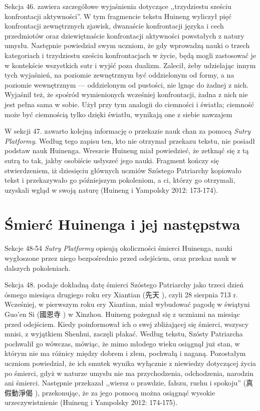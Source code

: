 Sekcja 46. zawiera szczegółowe wyjaśnienia dotyczące ,,trzydziestu sześciu konfrontacji aktywności''. W tym fragmencie tekstu Huineng wyliczył pięć konfrontacji zewnętrznych zjawisk, dwanaście konfrontacji języka i cech przedmiotów oraz dziewiętnaście konfrontacji aktywności powstałych z natury umysłu.
Następnie powiedział swym uczniom, że gdy wprowadzą nauki o trzech kategoriach i trzydziestu sześciu konfrontacjach w życie, będą mogli zastosować je w kontekście wszystkich sutr i wyjść poza dualizm.
Zalecił, żeby udzielając innym tych wyjaśnień, na poziomie zewnętrznym być oddzielonym od formy, a na poziomie wewnętrznym --- oddzielonym od pustości, nie lgnąc do żadnej z nich.
Wyjaśnił też, że spośród wymienionych wcześniej konfrontacji, żadna z nich nie jest pełna sama w sobie.
Użył przy tym analogii do ciemności i światła; ciemność może być ciemnością tylko dzięki światłu, wynikają one z siebie nawzajem\ibid

W sekcji 47. zawarto kolejną informację o przekazie nauk chan za pomocą \textit{Sutry Platformy}. %
Według tego zapisu ten, kto nie otrzymał przekazu tekstu, nie posiadł podstaw nauk Huinenga.
Wreszcie Huineng miał powiedzieć, że zetknąć się z tą sutrą to tak, jakby osobiście usłyszeć jego nauki.
Fragment kończy się stwierdzeniem, iż dziesięciu głównych uczniów Szóstego Patriarchy kopiowało tekst i przekazywało go późniejszym pokoleniom, a ci, którzy go otrzymali, uzyskali wgląd w swoją naturę
(Huineng i Yampolsky 2012: 173-174).

\section{Śmierć Huinenga i jej następstwa}
Sekcje 48-54 \textit{Sutry Platformy} opisują okoliczności śmierci Huinenga, nauki wygłoszone przez niego bezpośrednio przed odejściem, oraz przekaz nauk w dalszych pokoleniach.

Sekcja 48. podaje dokładną datę śmierci Szóstego Patriarchy jako trzeci dzień ósmego miesiąca drugiego roku ery Xiantian (先天 ), czyli 28 sierpnia 713 r.
Wcześniej, w pierwszym roku ery Xiantian, miał wybudować pagodę w świątyni Guo'en Si (國恩寺 ) w Xinzhou.
Huineng pożegnał się z uczniami na miesiąc przed odejściem.
Kiedy poinformował ich o swej zbliżającej się śmierci, wszyscy mnisi, z wyjątkiem Shenhui, zaczęli płakać.
Według tekstu, Szósty Patriarcha pochwalił go wówczas, mówiąc, że mimo młodego wieku osiągnął już stan, w którym nie ma różnicy między dobrem i złem, pochwałą i naganą.
Pozostałym uczniom powiedział, że ich smutek wynika wyłącznie z niewiedzy dotyczącej życia po śmierci, gdyż w naturze umysłu nie ma przychodzenia, odchodzenia, narodzin ani śmierci.
Następnie przekazał ,,wiersz o prawdzie, fałszu, ruchu i spokoju'' (真假動淨偈 ), przekonując, że za jego pomocą można osiągnąć wysokie urzeczywistnienie
(Huineng i Yampolsky 2012: 174-175).

